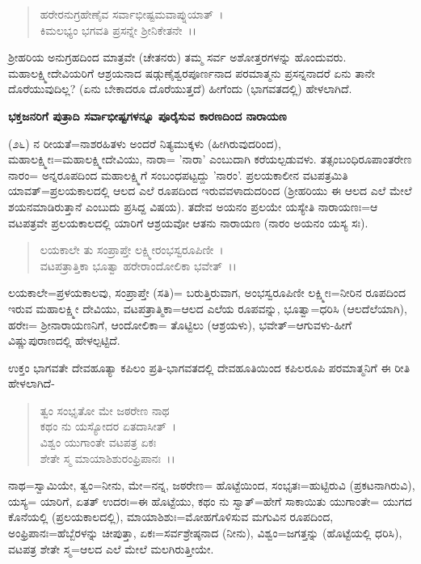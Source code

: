 \begin{verse}
ಹರೇರನುಗ್ರಹೇಣೈವ ಸರ್ವಾಭೀಷ್ಟಮವಾಪ್ನುಯಾತ್~।\\ ಕಿಮಲಭ್ಯಂ ಭಗವತಿ ಪ್ರಸನ್ನೇ ಶ‍್ರೀನಿಕೇತನೇ~।।
\end{verse}

ಶ‍್ರೀಹರಿಯ ಅನುಗ್ರಹದಿಂದ ಮಾತ್ರವೇ (ಚೇತನರು) ತಮ್ಮ ಸರ್ವ ಅಶೋತ್ತರಗಳನ್ನು ಹೊಂದುವರು. ಮಹಾಲಕ್ಷ್ಮೀದೇವಿಯರಿಗೆ ಆಶ್ರಯನಾದ ಷಡ್ಗುಣೈಶ್ವರಪೂರ್ಣನಾದ ಪರಮಾತ್ಮನು ಪ್ರಸನ್ನನಾದರೆ ಏನು ತಾನೇ ದೊರೆಯುವುದಿಲ್ಲ? (ಏನು ಬೇಕಾದರೂ ದೊರೆಯುತ್ತದೆ) ಹೀಗೆಂದು (ಭಾಗವತದಲ್ಲಿ) ಹೇಳಲಾಗಿದೆ.

\begin{center}
\textbf{ಭಕ್ತಜನರಿಗೆ ಪುತ್ರಾದಿ ಸರ್ವಾಭೀಷ್ಟಗಳನ್ನೂ ಪೂರೈಸುವ ಕಾರಣದಿಂದ ನಾರಾಯಣ}
\end{center}

(೨೬) ನ ರೀಯತೆ=ನಾಶರಹಿತಳು ಅಂದರೆ ನಿತ್ಯಮುಕ್ಕಳು (ಹೀಗಿರುವುದರಿಂದ), ಮಹಾಲಕ್ಷ್ಮೀಃ=ಮಹಾಲಕ್ಷ್ಮೀದೇವಿಯು, ನಾರಾ= 'ನಾರಾ' ಎಂಬುದಾಗಿ ಕರೆಯಲ್ಪಡುವಳು. ತತ್ಸಂಬಂಧಿರೂಪಾಂತರೇಣ ನಾರಂ= ಅನ್ನರೂಪದಿಂದ ಮಹಾಲಕ್ಷ್ಮಿಗೆ ಸಂಬಂಧಪಟ್ಟದ್ದು 'ನಾರಂ'. ಪ್ರಲಯಕಾಲೀನ ವಟಪತ್ರಮಿತಿ ಯಾವತ್=ಪ್ರಲಯಕಾಲದಲ್ಲಿ ಆಲದ ಎಲೆ ರೂಪದಿಂದ ಇರುವವಳಾದುದರಿಂದ (ಶ‍್ರೀಹರಿಯು ಈ ಆಲದ ಎಲೆ ಮೇಲೆ ಶಯನಮಾಡಿರುತ್ತಾನೆ ಎಂಬುದು ಪ್ರಸಿದ್ದ ವಿಷಯ). ತದೇವ ಅಯನಂ ಪ್ರಲಯೇ ಯಸ್ಯೇತಿ ನಾರಾಯಣಃ=ಆ ವಟಪತ್ರವೇ ಪ್ರಲಯಕಾಲದಲ್ಲಿ ಯಾರಿಗೆ ಆಶ್ರಯವೋ ಆತನು ನಾರಾಯಣ (ನಾರಂ ಅಯನಂ ಯಸ್ಯ ಸಃ).

\begin{verse}
ಲಯಕಾಲೇ ತು ಸಂಪ್ರಾಪ್ತೇ ಲಕ್ಷ್ಮೀರಂಭಸ್ವರೂಪಿಣೀ~।\\ ವಟಪತ್ರಾತ್ತಿಕಾ ಭೂತ್ವಾ ಹರೇರಾಂದೋಲಿಕಾ ಭವೇತ್~।।
\end{verse}


ಲಯಕಾಲೇ=ಪ್ರಳಯಕಾಲವು, ಸಂಪ್ರಾಪ್ತೇ (ಸತಿ)= ಬರುತ್ತಿರುವಾಗ, ಅಂಭಸ್ವರೂಪಿಣೀ ಲಕ್ಷ್ಮೀಃ=ನೀರಿನ ರೂಪದಿಂದ ಇರುವ ಮಹಾಲಕ್ಷ್ಮೀ ದೇವಿಯು, ವಟಪತ್ರಾತ್ಮಿಕಾ=ಆಲದ ಎಲೆಯ ರೂಪವನ್ನು, ಭೂತ್ವಾ=ಧರಿಸಿ (ಆಲದೆಲೆಯಾಗಿ), ಹರೇಃ= ಶ‍್ರೀನಾರಾಯಣನಿಗೆ, ಆಂದೋಲಿಕಾ= ತೊಟ್ಟಿಲು (ಆಶ್ರಯಳು), ಭವೇತ್=ಆಗುವಳು-ಹೀಗೆ ವಿಷ್ಣುಪುರಾಣದಲ್ಲಿ ಹೇಳಲ್ಪಟ್ಟಿದೆ.

ಉಕ್ತಂ ಭಾಗವತೇ ದೇವಹೂತ್ಯಾ ಕಪಿಲಂ ಪ್ರತಿ-ಭಾಗವತದಲ್ಲಿ ದೇವಹೂತಿಯಿಂದ ಕಪಿಲರೂಪಿ ಪರಮಾತ್ಮನಿಗೆ ಈ ರೀತಿ ಹೇಳಲಾಗಿದೆ-

\begin{verse}
ತ್ವಂ ಸಂಭೃತೋ ಮೇ ಜಠರೇಣ ನಾಥ\\ ಕಥಂ ನು ಯಸ್ಯೋದರ ಏತದಾಸೀತ್~।\\ ವಿಶ್ವಂ ಯುಗಾಂತೇ ವಟಪತ್ರ ಏಕಃ\\ ಶೇತೇ ಸ್ಮ ಮಾಯಾಶಿಶುರಂಫ್ರಿಪಾನಃ~।।
\end{verse}

ನಾಥ=ಸ್ವಾಮಿಯೇ, ತ್ವಂ=ನೀನು, ಮೇ=ನನ್ನ, ಜಠರೇಣ= ಹೊಟ್ಟೆಯಿಂದ, ಸಂಭೃತಃ=ಹುಟ್ಟಿರುವಿ (ಪ್ರಕಟನಾಗಿರುವಿ), ಯಸ್ಯ= ಯಾರಿಗೆ, ಏತತ್ ಉದರಃ=ಈ ಹೊಟ್ಟೆಯು, ಕಥಂ ನು ಸ್ವಾತ್=ಹೇಗೆ ಸಾಕಾಯಿತು ಯುಗಾಂತೇ= ಯುಗದ ಕೊನೆಯಲ್ಲಿ (ಪ್ರಲಯಕಾಲದಲ್ಲಿ), ಮಾಯಾಶಿಶುಃ=ಮೋಹಗೊಳಿಸುವ ಮಗುವಿನ ರೂಪದಿಂದ, ಅಂಫ್ರಿಪಾನಃ=ಹೆಬ್ಬೆರಳನ್ನು ಚೀಪುತ್ತಾ, ಏಕಃ=ಸರ್ವಶ್ರೇಷ್ಠನಾದ (ನೀನು), ವಿಶ್ವಂ=ಜಗತ್ತನ್ನು (ಹೊಟ್ಟೆಯಲ್ಲಿ ಧರಿಸಿ), ವಟಪತ್ರ ಶೇತೇ ಸ್ಮ=ಆಲದ ಎಲೆ ಮೇಲೆ ಮಲಗಿರುತ್ತೀಯೇ.

